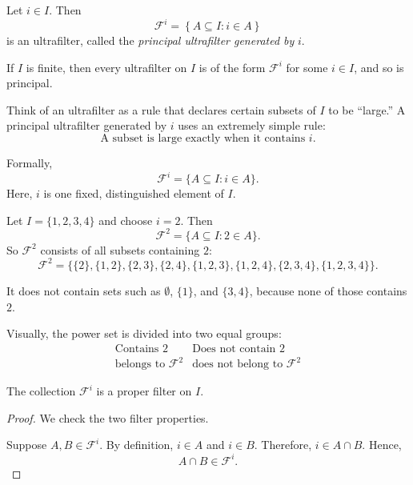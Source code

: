 {\begin{defn}
Let \(i \in I\). Then
\[
\mathcal{F}^{i}
=
\left\{
A \subseteq I : i \in A
\right\}
\]
is an ultrafilter, called the \emph{principal ultrafilter generated by}
\(i\).

If \(I\) is finite, then every ultrafilter on \(I\) is of the form
\(\mathcal{F}^{i}\) for some \(i \in I\), and so is principal.

Think of an ultrafilter as a rule that declares certain subsets of \(I\) to
be ``large.'' A principal ultrafilter generated by \(i\) uses an extremely
simple rule:
\begin{equation*}
\boxed{\text{A subset is large exactly when it contains } i.}
\end{equation*}

Formally,
\[
\mathcal{F}^i = \{A \subseteq I : i \in A\}.
\]
Here, \(i\) is one fixed, distinguished element of \(I\).
\end{defn}

\begin{example}
Let \(I = \{1,2,3,4\}\) and choose \(i=2\). Then
\[
\mathcal{F}^2 = \{A \subseteq I : 2 \in A\}.
\]
So \(\mathcal{F}^2\) consists of all subsets containing \(2\):
\begin{equation*}
\mathcal{F}^2 =
\bigl\{
\{2\},
\{1,2\},
\{2,3\},
\{2,4\},
\{1,2,3\},
\{1,2,4\},
\{2,3,4\},
\{1,2,3,4\}
\bigr\}.
\end{equation*}

It does not contain sets such as \(\emptyset\), \(\{1\}\), and \(\{3,4\}\),
because none of those contains \(2\).

Visually, the power set is divided into two equal groups:
\[
\begin{array}{c|c}
\text{Contains } 2 & \text{Does not contain } 2 \\
\hline
\text{belongs to } \mathcal{F}^2 & \text{does not belong to } \mathcal{F}^2
\end{array}
\]
\end{example}

\begin{prop}
The collection \(\mathcal{F}^i\) is a proper filter on \(I\).
\end{prop}

\begin{proof}
We check the two filter properties.

Suppose \(A,B \in \mathcal{F}^i\). By definition, \(i \in A\) and
\(i \in B\). Therefore, \(i \in A \cap B\). Hence,
\[
A \cap B \in \mathcal{F}^i.
\]


\end{proof}}
